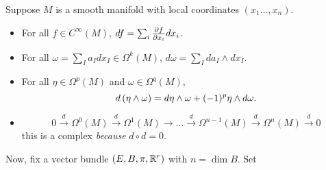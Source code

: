 \documentclass[main.tex]{subfiles}
\begin{document}
         Suppose $M$ is a smooth manifold with local coordinates $(x_1 \dots, x_n)$. 
        \begin{note}
            \begin{itemize}
                \item For all $f \in C^\infty(M)$, $df = \sum_i \frac{ \partial f }{ \partial x_i } dx_i$.
                \item For all $\omega = \sum_I a_I dx_I \in \Omega^k(M)$, $d\omega = \sum_I da_I \wedge dx_I$.
                \item {} For all $\eta \in \Omega^p(M)$ and $\omega \in \Omega^q(M)$, 
                \[
                d\left( \eta \wedge \omega  \right) = d\eta \wedge \omega + (-1)^{p} \eta \wedge d \omega.
                \]
                \item {}
                \[
                0 \overset{d}{\to} \Omega^0(M) \overset{d}{\to}  \Omega^1(M) \to  \dots \overset{d}{\to}  \Omega^{n-1}(M) \overset{d}{\to}  \Omega^n(M) \overset{d}{\to}  0
                \] this is a complex {\it because} $d \circ d = 0$.
            \end{itemize}
         
        \end{note}
        
    Now, fix a vector bundle $(E, B ,\pi, \mathbb{R}^r)$ with $n  = \dim B$. Set 
    
\end{document}
